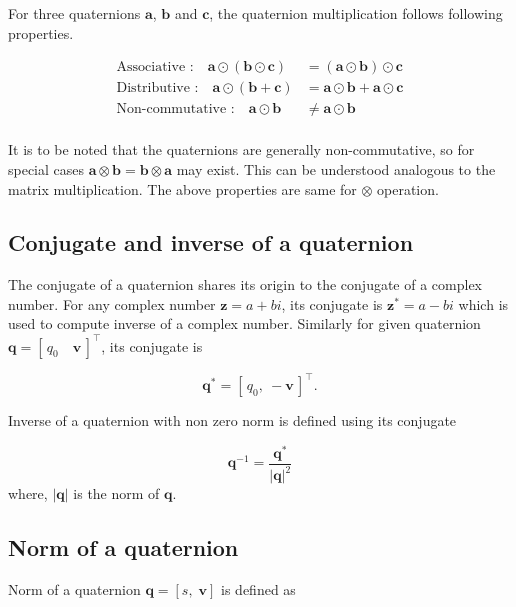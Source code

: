 \documentclass[12pt]{article}
\begin{document}
For three quaternions $\bm{a}$, $\bm{b}$ and $\bm{c}$, the quaternion multiplication follows following properties.

\begin{equation}
    \begin{split}
        \text{Associative :} \quad \bm{a} \odot (\bm{b} \odot \bm{c}) &= (\bm{a} \odot \bm{b}) \odot \bm{c} \\
        \text{Distributive :} \quad \bm{a} \odot (\bm{b} + \bm{c}) &= \bm{a} \odot \bm{b} + \bm{a} \odot \bm{c} \\
        \text{Non-commutative :} \quad \bm{a} \odot \bm{b} &\neq \bm{a} \odot \bm{b} \\
    \end{split} 
\end{equation} 

It is to be noted that the quaternions are generally non-commutative, so for special cases $\bm{a} \otimes \bm{b} = \bm{b} \otimes \bm{a}$ may exist. This can be understood analogous to the matrix multiplication. The above properties are same for $\otimes$ operation. 

\subsection{Conjugate and inverse of a quaternion}
The conjugate of a quaternion shares its origin to the conjugate of a complex number. For any complex number $\bm{z} = a + bi$, its conjugate is $\bm{z}^{*} = a - bi$ which is used to compute inverse of a complex number. Similarly for given quaternion $\bm{q} = [\, q_{0} \quad \bm{v} \,]^{\intercal}$, its conjugate is

\begin{equation}
    \bm{q}^{*} = [\, q_{0} ,\: -\bm{v} \,]^{\intercal}.
\end{equation}

Inverse of a quaternion with non zero norm is defined using its conjugate

\begin{equation}
    \bm{q}^{-1} = \frac{\bm{q}^{*}}{|\bm{q}|^{2}}
\end{equation}
where, $|\bm{q}|$ is the norm of $\bm{q}$.

\subsection{Norm of a quaternion}
Norm of a quaternion $\bm{q} = [s,\; \bm{v}]$ is defined as
\end{document}
